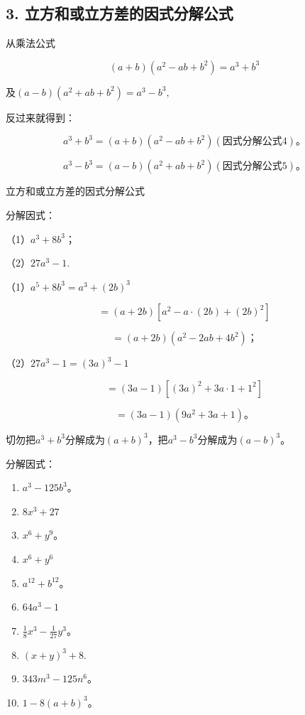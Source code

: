 \subsection{3. 立方和或立方差的因式分解公式}

从乘法公式

\[
(a + b) (a ^{2} - a b + b ^{2}) = a ^{3} + b ^{3}
\]

及\((a - b)(a^2 + ab + b^2) = a^3 - b^3,\)

反过来就得到：

\[
a ^{3} + b ^{3} = (a + b) \left(a ^{2} - a b + b ^{2}\right) (\text{因式分解公式4})\text{。}
\]

\[
a ^{3} - b ^{3} = (a - b) \left(a ^{2} + a b + b ^{2}\right) (\text{因式分解公式5})\text{。}
\]

立方和或立方差的因式分解公式

 分解因式：

（1）\(a^3 + 8b^3\)；

（2）\(27a^{3} - 1.\)


（1）\(a^5 + 8b^3 = a^3 + (2b)^3\)

\[
= (a + 2 b) \left[ a ^{2} - a \cdot (2 b) + (2 b) ^{2} \right]
\]

\[
= (a + 2 b) \left(a ^{2} - 2 a b + 4 b ^{2}\right)\text{；}
\]

（2）\(27a^{3} - 1 = (3a)^{3} - 1\)

\[
= (3 a - 1) [ (3 a) ^{2} + 3 a \cdot 1 + 1 ^{2} ]
\]

\[
= (3 a - 1) \left(9 a ^{2} + 3 a + 1\right)\text{。}
\]

切勿把\(a^3 + b^3\)分解成为\((a + b)^3\)，把\(a^3 - b^3\)分解成为\((a - b)^3\)。

分解因式：

\begin{enumerate}[start=1]
\item
  \(a^3 - 125b^3\)。
\item
  \(8x^{3} + 27\)
\item
  \(x^{6} + y^{9}\)。
\item
  \(x^{6} + y^{6}\)
\item
  \(a^{12} + b^{12}\)。
\item
  \(64a^{3} - 1\)
\item
  \(\frac{1}{8} x^3 - \frac{1}{27} y^3\)。
\item
  \((x + y)^{3} + 8.\)
\item
  \(343m^{3} - 125n^{6}\)。
\item
  \(1 - 8(a + b)^{3}\)。
\end{enumerate}

